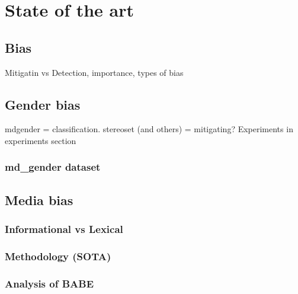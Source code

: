 \chapter{State of the art}

\section{Bias}
Mitigatin vs Detection, importance, types of bias
\section{Gender bias}
mdgender = classification. stereoset (and others) = mitigating?
Experiments in experiments section
\subsection{md\_gender dataset}
\section{Media bias}
\subsection{Informational vs Lexical}
\subsection{Methodology (SOTA)}


\subsection{Analysis of BABE}